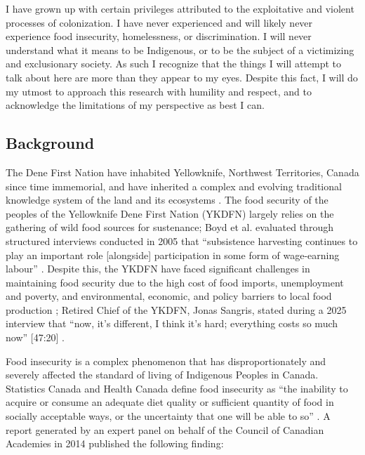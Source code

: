 \documentclass{report}
\begin{document}
\hspace{24pt} I have grown up with certain privileges attributed to the exploitative and violent processes of colonization. I have never experienced and will likely never experience food insecurity, homelessness, or discrimination. I will never understand what it means to be Indigenous, or to be the subject of a victimizing and exclusionary society. As such I recognize that the things I will attempt to talk about here are more than they appear to my eyes. Despite this fact, I will do my utmost to approach this research with humility and respect, and to acknowledge the limitations of my perspective as best I can.

\clearpage

\subsection{Background}

\hspace{24pt} The Dene First Nation have inhabited Yellowknife, Northwest Territories, Canada since time immemorial, and have inherited a complex and evolving traditional knowledge system of the land and its ecosystems \parencite{lorecapturingtraditional}.
The food security of the peoples of the Yellowknife Dene First Nation (YKDFN) largely relies on the gathering of wild food sources for sustenance;
Boyd et al. evaluated through structured interviews conducted in 2005 that ``subsistence harvesting continues to play an important role [alongside] participation in some form of wage-earning labour'' \parencite[268]{socialculturalcapital}.
Despite this, the YKDFN have faced significant challenges in maintaining food security due to the high cost of food imports, unemployment and poverty, and environmental, economic, and policy barriers to local food production \parencite{resilientcommunities};
Retired Chief of the YKDFN, Jonas Sangris, stated during a 2025 interview that ``now, it's different, I think it's hard; everything costs so much now'' [47:20] \parencite{jonassangris}.

\hspace{24pt} Food insecurity is a complex phenomenon that has disproportionately and severely affected the standard of living of Indigenous Peoples in Canada.
Statistics Canada and Health Canada define food insecurity as ``the inability to acquire or consume an adequate diet quality or sufficient quantity of food in socially acceptable ways, or the uncertainty that one will be able to so'' \parencite[para. 2]{statscanfoodinsecurity}.
A report generated by an expert panel on behalf of the Council of Canadian Academies in 2014 published the following finding:
\end{document}
